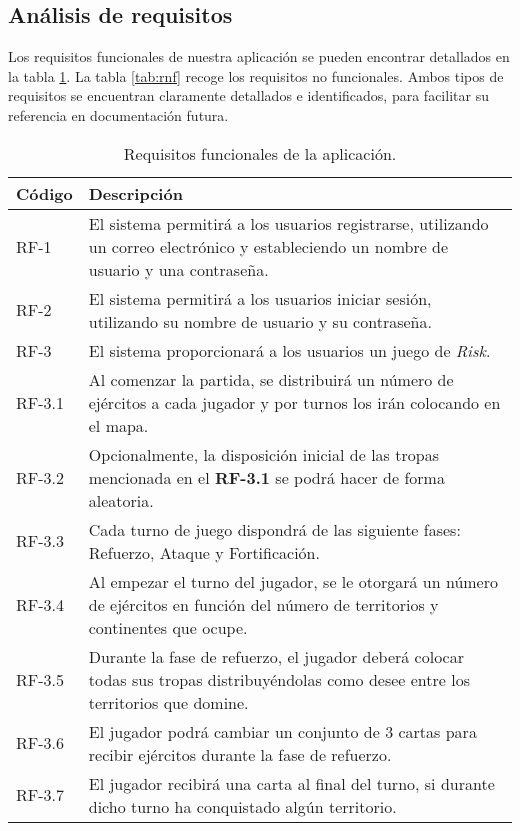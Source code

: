 \documentclass[11pt, a4paper, titlepage]{article}
\begin{document}
\subsection{Análisis de requisitos}
Los requisitos funcionales de nuestra aplicación se pueden encontrar detallados en la tabla \ref{tab:rf}. La tabla \ref{tab:rnf} recoge los requisitos no funcionales. Ambos tipos de requisitos se encuentran claramente detallados e identificados, para facilitar su referencia en documentación futura.
\renewcommand{\arraystretch}{1.3}\\
\begin{longtable}[h!]{| p{} | p{} |} 
    \caption{Requisitos funcionales de la aplicación.}
    \label{tab:rf}
    \centering
        \hline
         Código & Descripción  \\
         \hline
         RF-1 & El sistema permitirá a los usuarios registrarse, utilizando un correo electrónico y estableciendo un nombre de usuario y una contraseña.\\
         \hline
         RF-2 & El sistema permitirá a los usuarios iniciar sesión, utilizando su nombre de usuario y su contraseña.\\
         \hline
         RF-3 & El sistema proporcionará a los usuarios un juego de \textit{Risk}.\\
         \hline
         RF-3.1 & Al comenzar la partida, se distribuirá un número de ejércitos a cada jugador y por turnos los irán colocando en el mapa.\\
         \hline
         RF-3.2 & Opcionalmente, la disposición inicial de las tropas mencionada en el \textbf{RF-3.1}  se podrá hacer de forma aleatoria.\\
         \hline
         RF-3.3 & Cada turno de juego dispondrá de las siguiente fases: Refuerzo, Ataque y Fortificación. \\
         \hline
         RF-3.4 & Al empezar el turno del jugador, se le otorgará un número de ejércitos en función del número de territorios y continentes que ocupe.\\
         \hline
         RF-3.5 & Durante la fase de refuerzo, el jugador deberá colocar todas sus tropas distribuyéndolas como desee entre los territorios que domine.\\
         \hline
         RF-3.6 & El jugador podrá cambiar un conjunto de 3 cartas para recibir ejércitos durante la fase de refuerzo.\\
         \hline
         RF-3.7 & El jugador recibirá una carta al final del turno, si durante dicho turno ha conquistado algún territorio.\\

\end{longtable}
\end{document}
